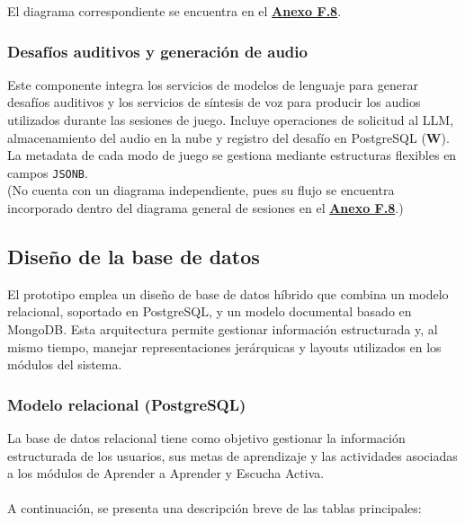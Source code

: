 El diagrama correspondiente se encuentra en el \hyperref[fig:anexoF-listening-sessions]{\textbf{Anexo F.8}}.

\subsubsection{Desafíos auditivos y generación de audio}

Este componente integra los servicios de modelos de lenguaje para generar desafíos auditivos y los servicios de síntesis de voz para producir los audios utilizados durante las sesiones de juego. Incluye operaciones de solicitud al LLM, almacenamiento del audio en la nube y registro del desafío en PostgreSQL (\textbf{W}). La metadata de cada modo de juego se gestiona mediante estructuras flexibles en campos \texttt{JSONB}.
\\

(No cuenta con un diagrama independiente, pues su flujo se encuentra incorporado dentro del diagrama general de sesiones en el \hyperref[fig:anexoF-listening-sessions]{\textbf{Anexo F.8}}.)

\subsection{Diseño de la base de datos}

El prototipo emplea un diseño de base de datos híbrido que combina un modelo relacional,
soportado en PostgreSQL, y un modelo documental basado en MongoDB. Esta arquitectura permite
gestionar información estructurada y, al mismo tiempo, manejar representaciones jerárquicas y
layouts utilizados en los módulos del sistema.

\subsubsection{Modelo relacional (PostgreSQL)}

La base de datos relacional tiene como objetivo gestionar la información estructurada de los
usuarios, sus metas de aprendizaje y las actividades asociadas a los módulos de Aprender a
Aprender y Escucha Activa. 
\\
\\
A continuación, se presenta una descripción breve de las tablas principales:

